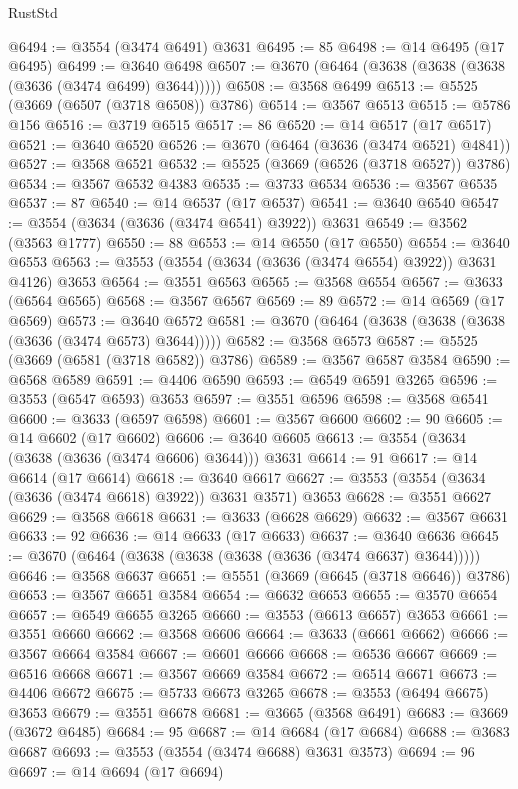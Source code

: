 \begin{lexlean}{RustStd}
\begin{coremodule}
@6494 := @3554 (@3474 @6491) @3631
@6495 := 85
@6498 := @14 @6495 (@17 @6495)
@6499 := @3640 @6498
@6507 := @3670 (@6464 (@3638 (@3638 (@3638 (@3636 (@3474 @6499) @3644)))))
@6508 := @3568 @6499
@6513 := @5525 (@3669 (@6507 (@3718 @6508)) @3786)
@6514 := @3567 @6513
@6515 := @5786 @156
@6516 := @3719 @6515
@6517 := 86
@6520 := @14 @6517 (@17 @6517)
@6521 := @3640 @6520
@6526 := @3670 (@6464 (@3636 (@3474 @6521) @4841))
@6527 := @3568 @6521
@6532 := @5525 (@3669 (@6526 (@3718 @6527)) @3786)
@6534 := @3567 @6532 @4383
@6535 := @3733 @6534
@6536 := @3567 @6535
@6537 := 87
@6540 := @14 @6537 (@17 @6537)
@6541 := @3640 @6540
@6547 := @3554 (@3634 (@3636 (@3474 @6541) @3922)) @3631
@6549 := @3562 (@3563 @1777)
@6550 := 88
@6553 := @14 @6550 (@17 @6550)
@6554 := @3640 @6553
@6563 := @3553 (@3554 (@3634 (@3636 (@3474 @6554) @3922)) @3631 @4126) @3653
@6564 := @3551 @6563
@6565 := @3568 @6554
@6567 := @3633 (@6564 @6565)
@6568 := @3567 @6567
@6569 := 89
@6572 := @14 @6569 (@17 @6569)
@6573 := @3640 @6572
@6581 := @3670 (@6464 (@3638 (@3638 (@3638 (@3636 (@3474 @6573) @3644)))))
@6582 := @3568 @6573
@6587 := @5525 (@3669 (@6581 (@3718 @6582)) @3786)
@6589 := @3567 @6587 @3584
@6590 := @6568 @6589
@6591 := @4406 @6590
@6593 := @6549 @6591 @3265
@6596 := @3553 (@6547 @6593) @3653
@6597 := @3551 @6596
@6598 := @3568 @6541
@6600 := @3633 (@6597 @6598)
@6601 := @3567 @6600
@6602 := 90
@6605 := @14 @6602 (@17 @6602)
@6606 := @3640 @6605
@6613 := @3554 (@3634 (@3638 (@3636 (@3474 @6606) @3644))) @3631
@6614 := 91
@6617 := @14 @6614 (@17 @6614)
@6618 := @3640 @6617
@6627 := @3553 (@3554 (@3634 (@3636 (@3474 @6618) @3922)) @3631 @3571) @3653
@6628 := @3551 @6627
@6629 := @3568 @6618
@6631 := @3633 (@6628 @6629)
@6632 := @3567 @6631
@6633 := 92
@6636 := @14 @6633 (@17 @6633)
@6637 := @3640 @6636
@6645 := @3670 (@6464 (@3638 (@3638 (@3638 (@3636 (@3474 @6637) @3644)))))
@6646 := @3568 @6637
@6651 := @5551 (@3669 (@6645 (@3718 @6646)) @3786)
@6653 := @3567 @6651 @3584
@6654 := @6632 @6653
@6655 := @3570 @6654
@6657 := @6549 @6655 @3265
@6660 := @3553 (@6613 @6657) @3653
@6661 := @3551 @6660
@6662 := @3568 @6606
@6664 := @3633 (@6661 @6662)
@6666 := @3567 @6664 @3584
@6667 := @6601 @6666
@6668 := @6536 @6667
@6669 := @6516 @6668
@6671 := @3567 @6669 @3584
@6672 := @6514 @6671
@6673 := @4406 @6672
@6675 := @5733 @6673 @3265
@6678 := @3553 (@6494 @6675) @3653
@6679 := @3551 @6678
@6681 := @3665 (@3568 @6491)
@6683 := @3669 (@3672 @6485)
@6684 := 95
@6687 := @14 @6684 (@17 @6684)
@6688 := @3683 @6687
@6693 := @3553 (@3554 (@3474 @6688) @3631 @3573)
@6694 := 96
@6697 := @14 @6694 (@17 @6694)

\end{coremodule}
\end{lexlean}
